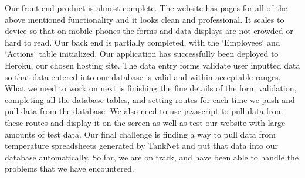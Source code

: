 \documentclass[draftclsnofoot,onecolumn,letterpaper,10pt,compsoc]{IEEEtran}
\begin{document}
Our front end product is almost complete.
The website has pages for all of the above mentioned functionality and it looks clean and professional.
It scales to device so that on mobile phones the forms and data displays are not crowded or hard to read.
Our back end is partially completed, with the  `Employees` and `Actions` table initialized.
Our application has successfully been deployed to Heroku, our chosen hosting site.
The data entry forms validate user inputted data so that data entered into our database is valid and within acceptable ranges.
What we need to work on next is finishing the fine details of the form validation, completing all the database tables, and setting routes for each time we push and pull data from the database.
We also need to use javascript to pull data from these routes and display it on the screen as well as test our website with large amounts of test data.
Our final challenge is finding a way to pull data from temperature spreadsheets generated by TankNet and put that data into our database automatically.
So far, we are on track, and have been able to handle the problems that we have encountered.
\end{document}
